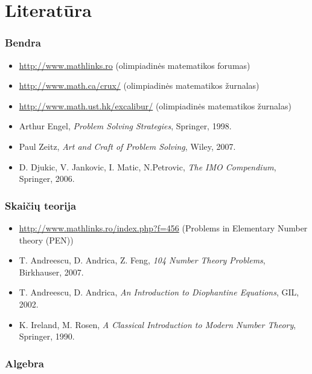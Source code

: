 \pagestyle{empty}
\section*{Literatūra}

\subsubsection{Bendra}

\begin{itemize}
  \item \url{http://www.mathlinks.ro} \quad (olimpiadinės matematikos forumas)
  \item \url{http://www.math.ca/crux/} \quad (olimpiadinės matematikos žurnalas)
  \item \url{http://www.math.ust.hk/excalibur/} \quad (olimpiadinės matematikos žurnalas)
  \item Arthur Engel, \emph{Problem Solving Strategies}, Springer, 1998.
  \item Paul Zeitz, \emph{Art and Craft of Problem Solving}, Wiley, 2007.
  \item D. Djukic, V. Jankovic, I. Matic, N.Petrovic, \emph{The IMO
    Compendium}, Springer, 2006.
\end{itemize}


\subsubsection{Skaičių teorija}

\begin{itemize}
  \item \url{http://www.mathlinks.ro/index.php?f=456} \quad(Problems in Elementary
    Number theory (PEN))
  \item T. Andreescu, D. Andrica, Z. Feng, \emph{104 Number Theory
    Problems}, Birkhauser, 2007.
  \item T. Andreescu, D. Andrica, \emph{An Introduction to Diophantine
    Equations}, GIL, 2002.
  \item K. Ireland, M. Rosen, \emph{A Classical Introduction to Modern
    Number Theory}, Springer, 1990.
\end{itemize}

\subsubsection{Algebra}


